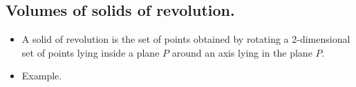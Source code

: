 \documentclass[12pt]{book}
\newcommand{\optionalDisplay}[1]{}
\renewcommand{\optionalDisplay}[1]{#1}
\begin{document}
\subsection{Volumes of solids of revolution.}
\begin{itemize}
\item A solid of revolution is the set of points obtained by rotating a 2-dimensional set of points lying inside a plane $P$ around an axis lying in the plane $P$.
\item Example. \label{itemExampleFigureRotationalSolid}


\optionalDisplay{

}
\end{itemize}
\end{document}

